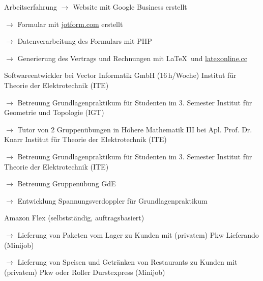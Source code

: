 \begin{rubric}{\textcolor{black!20!blue!100}{Arbeitserfahrung}}
				\setlength{\hangindent}{\widthof{$\rightarrow$ }}
				$\rightarrow$ Website mit Google Business erstellt
	
				$\rightarrow$ Formular mit \href{https://www.jotform.com/}{jotform.com} erstellt
	
				$\rightarrow$ Datenverarbeitung des Formulars mit PHP
	
				$\rightarrow$ Generierung des Vertrags und Rechnungen mit \LaTeX\ und \href{https://latexonline.cc/}{latexonline.cc}
				
			\entry*[05/2016 --- 10/2017]
				Softwareentwickler bei Vector Informatik GmbH (16\,h/Woche)
			\entry*[10/2015 --- 03/2016]
				Institut für Theorie der Elektrotechnik (ITE)
					
				\setlength{\hangindent}{\widthof{$\rightarrow$ }}
				$\rightarrow$ Betreuung Grundlagenpraktikum für Studenten im 3. Semester
			\entry*
				Institut für Geometrie und Topologie (IGT)
				
				\setlength{\hangindent}{\widthof{$\rightarrow$ }}
				$\rightarrow$ Tutor von 2 Gruppenübungen in Höhere Mathematik III bei Apl. Prof. Dr. Knarr
			\entry*[10/2014 --- 03/2015]
				Institut für Theorie der Elektrotechnik (ITE)
				
				\setlength{\hangindent}{\widthof{$\rightarrow$ }}
				$\rightarrow$ Betreuung Grundlagenpraktikum für Studenten im 3. Semester
			\entry*[10/2013 --- 03/2014]
				Institut für Theorie der Elektrotechnik (ITE)
				
				\setlength{\hangindent}{\widthof{$\rightarrow$ }}
				$\rightarrow$ Betreuung Gruppenübung GdE
				
				$\rightarrow$ Entwicklung Spannungsverdoppler für Grundlagenpraktikum
		
			\entry*[09/11/2020 --- 06/2022]
				Amazon Flex (selbstständig, auftragsbasiert)
				
				\setlength{\hangindent}{\widthof{$\rightarrow$ }}
				$\rightarrow$ Lieferung von Paketen vom Lager zu Kunden mit (privatem) Pkw
			\entry*[24/10/2020 --- 04/01/2021]
				Lieferando (Minijob)
				
				\setlength{\hangindent}{\widthof{$\rightarrow$ }}
				$\rightarrow$ Lieferung von Speisen und Getränken von Restaurants zu Kunden mit (privatem) Pkw oder Roller
			\entry*[17/07/2020 --- 18/10/2020]
				Durstexpress (Minijob)
				

\end{rubric}
